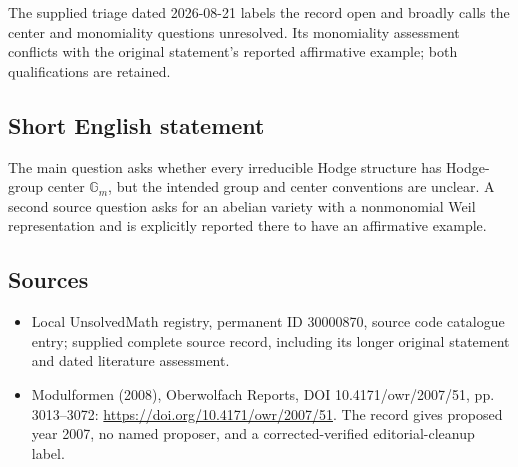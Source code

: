 \documentclass[11pt]{article}
\begin{document}
The supplied triage dated 2026-08-21 labels the record open and broadly calls the center and monomiality questions unresolved. Its monomiality assessment conflicts with the original statement's reported affirmative example; both qualifications are retained.
\subsection{Short English statement}
The main question asks whether every irreducible Hodge structure has Hodge-group center $\mathbb G_m$, but the intended group and center conventions are unclear. A second source question asks for an abelian variety with a nonmonomial Weil representation and is explicitly reported there to have an affirmative example.
\subsection{Sources}
\begin{itemize}
\item Local UnsolvedMath registry, permanent ID 30000870, source code catalogue entry; supplied complete source record, including its longer original statement and dated literature assessment.
\item Modulformen (2008), Oberwolfach Reports, DOI 10.4171/owr/2007/51, pp. 3013--3072: \url{https://doi.org/10.4171/owr/2007/51}. The record gives proposed year 2007, no named proposer, and a corrected-verified editorial-cleanup label.
\end{itemize}
\end{document}
